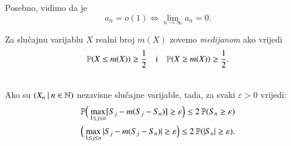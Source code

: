Posebno, vidimo da je
\begin{equation*}
    a_n = o(1) \iff \lim\limits_{n \to \infty} a_n = 0.
\end{equation*}

\begin{defn}    \label{defn:12.7-1}
    Za slu\v cajnu varijablu $X$ realni broj $m(X)$ zovemo \emph{medijanom} ako vrijedi
    \begin{equation*}
        \mathbb{P}({X \leq m(X)}) \geq \frac{1}{2} \quad \textnormal{i} \quad \mathbb{P}({X \geq m(X)}) \geq \frac{1}{2}.
    \end{equation*}
\end{defn}

\begin{lm}  \label{lm:12.8}
    \quad \\
    Ako su $({X_n} \: | \: {n \in \mathbb{N}})$ nezavisne slu\v cajne varijable, tada, za svaki $\varepsilon > 0$ vrijedi:
    \begin{equation*}
        \begin{gathered}
            \mathbb{P} \Big( \max\limits_{1 \leq j \leq n} [S_j - m(S_j - S_n)] \geq \varepsilon \Big) \leq 2 \: \mathbb{P} ( S_n \geq \varepsilon )\\
            \Big( \max\limits_{1 \leq j \leq n} |S_j - m(S_j - S_n)| \geq \varepsilon \Big) \leq 2 \: \mathbb{P}({|S_n| \geq \varepsilon}).
        \end{gathered}
    \end{equation*}
\end{lm}

